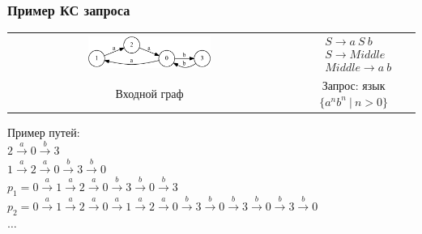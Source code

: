 \documentclass[xcolor=table]{beamer}
\begin{document}
\begin{frame} \frametitle{Пример КС запроса}
\begin{center}
  \begin{tabular}{  c  c  }
      \includegraphics[width=0.45\textwidth]{pictures/input.pdf}
      &
  $

  \begin{array}{rl}
     & S \rightarrow a \ S \ b \\
     & S \rightarrow Middle \\
     & Middle \rightarrow a \ b
  \end{array}

  $
  \\
  Входной граф
  &
  Запрос: язык $\{a^nb^n \ | \ n > 0 \}$

  \end{tabular}

\end{center}

\pause

\vspace{0.5cm}
Пример путей: \\
$2 \xrightarrow{a} 0 \xrightarrow{b} 3$ \\
$1 \xrightarrow{a} 2 \xrightarrow{a} 0 \xrightarrow{b} 3 \xrightarrow{b} 0$ \\
$p_1 = 0 \xrightarrow{a} 1 \xrightarrow{a} 2 \xrightarrow{a} 0 \xrightarrow{b} 3 \xrightarrow{b} 0 \xrightarrow{b} 3$ \\
$p_2 = 0 \xrightarrow{a} 1 \xrightarrow{a} 2 \xrightarrow{a} 0 \xrightarrow{a} 1 \xrightarrow{a} 2 \xrightarrow{a} 0 \xrightarrow{b} 3 \xrightarrow{b} 0 \xrightarrow{b} 3 \xrightarrow{b} 0 \xrightarrow{b} 3 \xrightarrow{b} 0$ \\
$\dots$

\end{frame}
\end{document}
